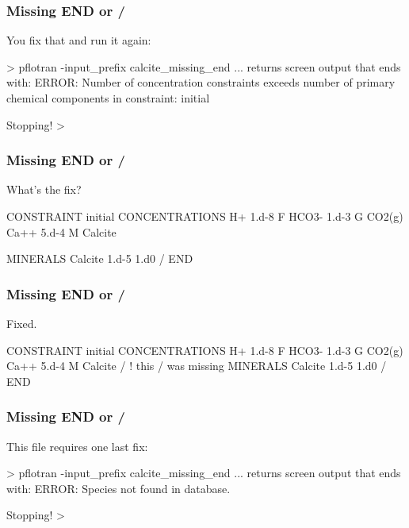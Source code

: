 \documentclass{beamer}
\newcommand\gehcomment[1]{{{\color{orange} #1}}}
\newcommand\redcomment[1]{{{\color{red} #1}}}
\newcommand\bluecomment[1]{{{\color{blue} #1}}}
\newcommand\greencomment[1]{{{\color{green} #1}}}
\newcommand\magentacomment[1]{{{\color{magenta} #1}}}
\begin{document}
\begin{frame}\frametitle{Missing \greencomment{END} or \greencomment{/}}
\redcomment{You fix that and run it again:}
\begin{semiverbatim}

> pflotran -input_prefix calcite_missing_end
... \gehcomment{returns screen output that ends with:}
  ERROR: Number of concentration constraints exceeds 
  number of primary chemical components in constraint:
  initial

  Stopping!
>
\end{semiverbatim}

\end{frame}

\begin{frame}\frametitle{Missing \greencomment{END} or \greencomment{/}}
\redcomment{What's the fix?}
\begin{semiverbatim}

CONSTRAINT initial
  CONCENTRATIONS
    H+     1.d-8      F
    HCO3-  1.d-3      G  CO2(g)
    Ca++   5.d-4      M  Calcite

  MINERALS
    Calcite 1.d-5 1.d0
  /
END
\end{semiverbatim}

\end{frame}

\begin{frame}\frametitle{Missing \greencomment{END} or \greencomment{/}}
\redcomment{Fixed.}
\begin{semiverbatim}

CONSTRAINT initial
  CONCENTRATIONS
    H+     1.d-8      F
    HCO3-  1.d-3      G  CO2(g)
    Ca++   5.d-4      M  Calcite
  \magentacomment{/} \bluecomment{! this \greencomment{/} was missing}
  MINERALS
    Calcite 1.d-5 1.d0
  /
END
\end{semiverbatim}

\end{frame}

\begin{frame}\frametitle{Missing \greencomment{END} or \greencomment{/}}
\redcomment{This file requires one last fix:}
\begin{semiverbatim}

> pflotran -input_prefix calcite_missing_end
... \gehcomment{returns screen output that ends with:}
  ERROR: Species not found in database.

  Stopping!
>
\end{semiverbatim}

\end{frame}
\end{document}
